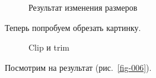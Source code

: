 \documentclass[
  english,
  russian,
  12pt,
  a4paper,
  DIV=11,
  numbers=noendperiod]{scrreprt}
\begin{document}
\begin{figure}


\caption{\label{fig-004}Результат изменения размеров}

\end{figure}%

Теперь попробуем обрезать картинку.

\begin{figure}


\caption{\label{fig-005}Clip и trim}

\end{figure}%

Посмотрим на результат (рис.~\ref{fig-006}).
\end{document}

